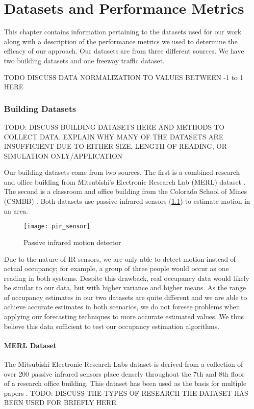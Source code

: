 \chapter{Datasets and Performance Metrics}
This chapter contains information pertaining to the datasets used for our work along with a description of the performance metrics  we used to determine the efficacy of our approach.  Our datasets are from three different sources.  We have two building datasets and one freeway traffic dataset.

TODO DISCUSS DATA NORMALIZATION TO VALUES BETWEEN -1 to 1 HERE

\subsection{Building Datasets}
TODO: DISCUSS BUILDING DATASETS HERE AND METHODS TO COLLECT DATA.  EXPLAIN WHY MANY OF THE DATASETS ARE INSUFFICIENT DUE TO EITHER SIZE, LENGTH OF READING, OR SIMULATION ONLY/APPLICATION

Our building datasets come from two sources.  The first is a combined research and office building from Mitsubishi's Electronic Research Lab (MERL) dataset \cite{Wren2007}.  The second is a classroom and office building from the Colorado School of Mines (CSMBB) \cite{Hoff2009, Howard2013}.  Both datasets use passive infrared sensors (\ref{fig:pirsensor}) to estimate motion in an area.  

\begin{figure}[h]
	\begin{center}
		\texttt{[image: pir\_sensor]}
	\end{center}
	\caption{Passive infrared motion detector}
	\label{fig:pirsensor}
\end{figure}

Due to the nature of IR sensors, we are only able to detect motion instead of actual occupancy; for example, a group of three people would occur as one reading in both systems.  Despite this drawback, real occupancy data would likely be similar to our data, but with higher variance and higher means.  As the range of occupancy estimates in our two datasets are quite different and we are able to achieve accurate estimates in both scenarios, we do not foresee problems when applying our forecasting techniques to more accurate estimated values.  We thus believe this data sufficient to test our occupancy estimation algorithms.

\subsubsection{MERL Dataset} 
The Mitsubishi Electronic Research Labs dataset is derived from a collection of over 200 passive infrared sensors place densely throughout the 7th and 8th floor of a research office building.  This dataset has been used as the basis for multiple papers \cite{Wren2003, Wren2006, Wren2007a, Dong2011, Minnen2004, Wren2006a, Wren2007}.  TODO: DISCUSS THE TYPES OF RESEARCH THE DATASET HAS BEEN USED FOR BRIEFLY HERE.

